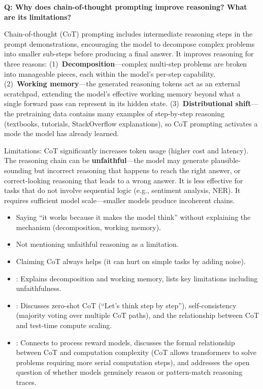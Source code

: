 \begin{interviewq}
\textbf{Q: Why does chain-of-thought prompting improve reasoning? What are
its limitations?}

 \quad {} \quad
\badgefreq{\freqhigh}

\stronganswer
Chain-of-thought (CoT) prompting includes intermediate reasoning steps in
the prompt demonstrations, encouraging the model to decompose complex
problems into smaller sub-steps before producing a final answer.  It
improves reasoning for three reasons: (1)~\textbf{Decomposition}---complex
multi-step problems are broken into manageable pieces, each within the
model's per-step capability.  (2)~\textbf{Working memory}---the generated
reasoning tokens act as an external scratchpad, extending the model's
effective working memory beyond what a single forward pass can represent
in its hidden state.  (3)~\textbf{Distributional shift}---the pretraining
data contains many examples of step-by-step reasoning (textbooks, tutorials,
StackOverflow explanations), so CoT prompting activates a mode the model has
already learned.

Limitations: CoT significantly increases token usage (higher cost and
latency).  The reasoning chain can be \textbf{unfaithful}---the model may
generate plausible-sounding but incorrect reasoning that happens to reach
the right answer, or correct-looking reasoning that leads to a wrong answer.
It is less effective for tasks that do not involve sequential logic (e.g.,
sentiment analysis, NER).  It requires sufficient model scale---smaller models
produce incoherent chains.

\redflags
\begin{itemize}
\item Saying ``it works because it makes the model think'' without explaining
  the mechanism (decomposition, working memory).
\item Not mentioning unfaithful reasoning as a limitation.
\item Claiming CoT always helps (it can hurt on simple tasks by adding noise).
\end{itemize}


\goodgreat
\begin{itemize}
\item {}: Explains decomposition and working memory, lists
  key limitations including unfaithfulness.
\item {}: Discusses zero-shot CoT (``Let's think step by step''),
  self-consistency (majority voting over multiple CoT paths), and the
  relationship between CoT and test-time compute scaling.
\item {}: Connects to process reward models, discusses the
  formal relationship between CoT and computation complexity (CoT allows
  transformers to solve problems requiring more serial computation steps),
  and addresses the open question of whether models genuinely reason or
  pattern-match reasoning traces.
\end{itemize}


\end{interviewq}
